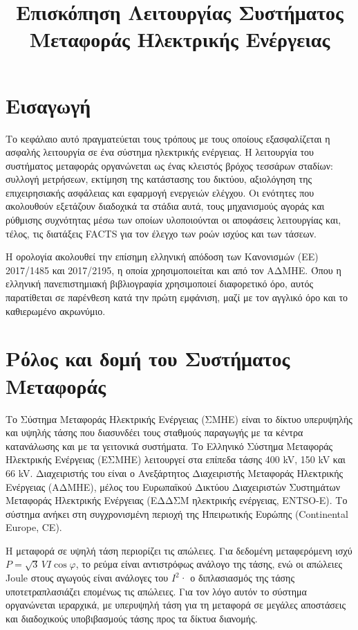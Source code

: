 \title{Επισκόπηση Λειτουργίας Συστήματος Μεταφοράς Ηλεκτρικής Ενέργειας}

\section{Εισαγωγή}
\label{kef-01-theoria}

Το κεφάλαιο αυτό πραγματεύεται τους τρόπους με τους οποίους εξασφαλίζεται η ασφαλής λειτουργία σε ένα σύστημα ηλεκτρικής ενέργειας. Η λειτουργία του συστήματος μεταφοράς οργανώνεται ως ένας
κλειστός βρόχος τεσσάρων σταδίων: συλλογή μετρήσεων, εκτίμηση της κατάστασης του δικτύου,
αξιολόγηση της επιχειρησιακής ασφάλειας και εφαρμογή ενεργειών ελέγχου. Οι ενότητες που
ακολουθούν εξετάζουν διαδοχικά τα στάδια αυτά, τους μηχανισμούς αγοράς και ρύθμισης
συχνότητας μέσω των οποίων υλοποιούνται οι αποφάσεις λειτουργίας και, τέλος, τις διατάξεις
FACTS για τον έλεγχο των ροών ισχύος και των τάσεων.

Η ορολογία ακολουθεί την επίσημη ελληνική απόδοση των Κανονισμών (ΕΕ) 2017/1485 και
2017/2195, η οποία χρησιμοποιείται και από τον ΑΔΜΗΕ. Όπου η ελληνική πανεπιστημιακή
βιβλιογραφία χρησιμοποιεί διαφορετικό όρο, αυτός παρατίθεται σε παρένθεση κατά την πρώτη
εμφάνιση, μαζί με τον αγγλικό όρο και το καθιερωμένο ακρωνύμιο.

\section{Ρόλος και δομή του Συστήματος Μεταφοράς}

Το Σύστημα Μεταφοράς Ηλεκτρικής Ενέργειας (ΣΜΗΕ) είναι το δίκτυο υπερυψηλής και υψηλής
τάσης που διασυνδέει τους σταθμούς παραγωγής με τα κέντρα κατανάλωσης και με τα γειτονικά
συστήματα. Το Ελληνικό Σύστημα Μεταφοράς Ηλεκτρικής Ενέργειας (ΕΣΜΗΕ) λειτουργεί στα επίπεδα
τάσης 400 kV, 150 kV και 66 kV. Διαχειριστής του είναι ο Ανεξάρτητος Διαχειριστής Μεταφοράς
Ηλεκτρικής Ενέργειας (ΑΔΜΗΕ), μέλος του Ευρωπαϊκού Δικτύου Διαχειριστών Συστημάτων Μεταφοράς
Ηλεκτρικής Ενέργειας (ΕΔΔΣΜ ηλεκτρικής ενέργειας, ENTSO-E). Το σύστημα ανήκει στη
συγχρονισμένη περιοχή της Ηπειρωτικής Ευρώπης (Continental Europe, CE).

Η μεταφορά σε υψηλή τάση περιορίζει τις απώλειες. Για δεδομένη μεταφερόμενη ισχύ
$P = \sqrt{3}\,V I \cos\varphi$, το ρεύμα είναι αντιστρόφως ανάλογο της τάσης, ενώ οι
απώλειες Joule στους αγωγούς είναι ανάλογες του $I^2$· ο διπλασιασμός της τάσης
υποτετραπλασιάζει επομένως τις απώλειες. Για τον λόγο αυτόν το σύστημα οργανώνεται
ιεραρχικά, με υπερυψηλή τάση για τη μεταφορά σε μεγάλες αποστάσεις και διαδοχικούς
υποβιβασμούς τάσης προς τα δίκτυα διανομής.

